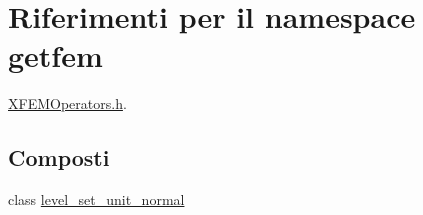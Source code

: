 \hypertarget{namespacegetfem}{\section{Riferimenti per il namespace getfem}
\label{namespacegetfem}
}


\hyperlink{XFEMOperators_8h}{X\-F\-E\-M\-Operators.\-h}.  


\subsection*{Composti}
\begin{DoxyCompactItemize}
\item 
class \hyperlink{classgetfem_1_1level__set__unit__normal}{level\-\_\-set\-\_\-unit\-\_\-normal}
\end{DoxyCompactItemize}
